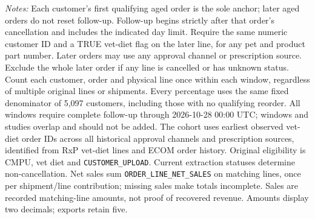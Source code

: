 \begin{table}[!htbp]
\begin{minipage}{\linewidth}
\footnotesize
\textit{Notes:} Each customer's first qualifying aged order is the sole anchor;
later aged orders do not reset follow-up. Follow-up begins strictly after that
order's cancellation and includes the indicated day limit. Require the same numeric customer ID and a TRUE vet-diet flag on the later line, for any pet and product part number. Later orders may use any approval channel or prescription
source. Exclude the whole later order if any line is cancelled or has unknown
status. Count each customer, order and physical line once within each window,
regardless of multiple original lines or shipments. Every percentage uses the
same fixed denominator of 5,097 customers, including those with no
qualifying reorder. All windows require complete follow-up through
2026-10-28 00:00 UTC; windows and studies overlap and should not be added.
The cohort uses earliest observed vet-diet order IDs across all historical approval channels and prescription sources, identified from RxP vet-diet lines and ECOM order history. Original eligibility is CMPU,
vet diet and \texttt{CUSTOMER\_UPLOAD}. Current extraction statuses determine
non-cancellation. Net sales sum \texttt{ORDER\_LINE\_NET\_SALES} on matching
lines, once per shipment/line contribution; missing sales make totals incomplete.
Sales are recorded matching-line amounts, not proof of recovered revenue.
Amounts display two decimals; exports retain five.
\end{minipage}
\end{table}
